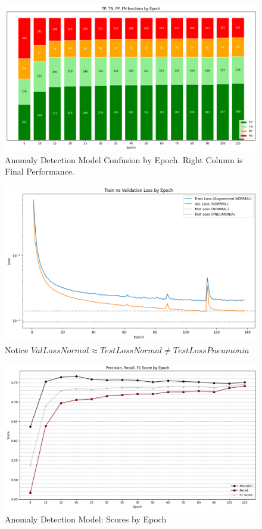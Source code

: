 \documentclass{article}
\begin{document}
\begin{figure}[H]
  \centering
  \includegraphics[width=1\linewidth]{confusion_by_epoch.png}
  \caption{Anomaly Detection Model Confusion by Epoch. Right Column is Final Performance.}
\end{figure}

\begin{figure}[H]
  \centering
  \includegraphics[width=1\linewidth]{train_val_loss_by_epoch.png}
  \caption{Notice $ValLossNormal \approx TestLossNormal \neq TestLossPneumonia$}
\end{figure}

\begin{figure}[H]
  \centering
  \includegraphics[width=1\linewidth]{scores_by_epoch.png}
  \caption{Anomaly Detection Model: Scores by Epoch}
\end{figure}
\end{document}
